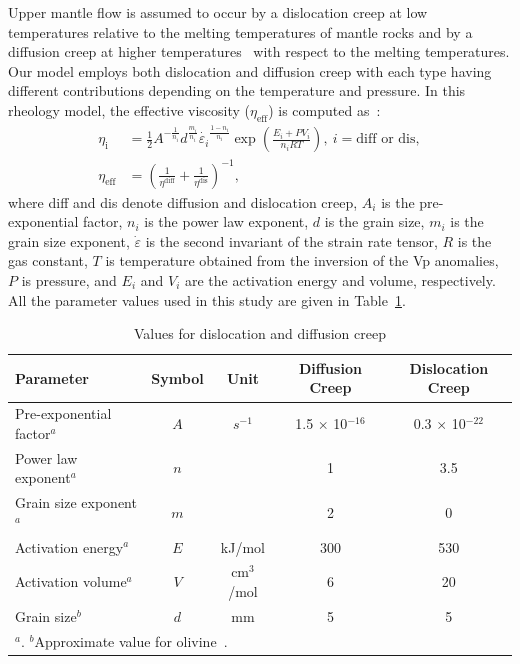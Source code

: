 \documentclass[draft,linenumbers]{agujournal2018}
\begin{document}
Upper mantle flow is assumed to occur by a dislocation creep at low temperatures relative to the melting temperatures of mantle rocks and by a diffusion creep at higher temperatures~\citep[e.g.,][]{gordon1967thermally} with respect to the melting temperatures. Our model employs both dislocation and diffusion creep with each type having different contributions depending on the temperature and pressure. In this rheology model, the effective viscosity ($\eta_{\text{eff}}$) is computed as~\citep{billen2007rheologic}:
%
\begin{align}
    \eta_{\text{i}} &= \frac{1}{2} A^{-\frac{1}{n_i}} d^\frac{m_i}{n_i} \dot{\varepsilon_i}^{\frac{1-n_i}{n_i}} \exp\left(\frac{E_i + PV_i}{n_iRT}\right),\ i=\text{diff or dis}, \\
    \eta_{\text{eff}} &= \left(\frac{1}{\eta^\text{diff}} + \frac{1}{\eta^\text{dis}}\right)^{-1},
\end{align}
%
where diff and dis denote diffusion and dislocation creep, $A_i$ is the pre-exponential factor, $n_i$ is the power law exponent, $d$ is the grain size, $m_i$ is the grain size exponent, $\dot{\varepsilon}$ is the second invariant of the strain rate tensor, $R$ is the gas constant, $T$ is temperature obtained from the inversion of the Vp anomalies, $P$ is pressure, and $E_i$ and $V_i$ are the activation energy and volume, respectively. All the parameter values used in this study are given in Table~\ref{table_model}.
%
\begin{table}[ht] 
    \caption{Values for dislocation and diffusion creep}
    \centering
    \begin{tabular}{l c c c c}
    \hline
     Parameter  & Symbol & Unit & Diffusion Creep & Dislocation Creep  \\
    \hline
      Pre-exponential factor$^a$ & $A$ & $s^{-1}$ & 1.5 $\times$ 10$^{-16}$ & 0.3 $\times$ 10$^{-22}$   \\
      Power law exponent$^a$ & $n$ & & 1 & 3.5  \\
      Grain size exponent$^a$  & $m$ & & 2 & 0   \\
      Activation energy$^a$  & $E$ & kJ/mol & 300 & 530   \\
      Activation volume$^a$  & $V$ & cm$^3$/mol & 6 & 20 \\
      Grain size$^b$         & $d$ & mm & 5 & 5 \\
    \hline
    \multicolumn{5}{l}{$^{a}$\citet{karato1993rheology}. $^b$Approximate value for olivine~\citep{karato1984grain}.}
    \end{tabular}
    \label{table_model}
\end{table}
\end{document}
